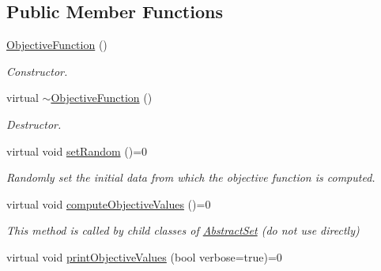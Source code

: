 \subsection*{Public Member Functions}
\begin{DoxyCompactItemize}
\item 
\hypertarget{classObjectiveFunction_a227885b9e68935571bf25d36689f029a}{\hyperlink{classObjectiveFunction_a227885b9e68935571bf25d36689f029a}{Objective\-Function} ()}\label{classObjectiveFunction_a227885b9e68935571bf25d36689f029a}

\begin{DoxyCompactList}\small\item\em Constructor. \end{DoxyCompactList}\item 
\hypertarget{classObjectiveFunction_a877b09fea55318719b9f37661ecdedf8}{virtual \hyperlink{classObjectiveFunction_a877b09fea55318719b9f37661ecdedf8}{$\sim$\-Objective\-Function} ()}\label{classObjectiveFunction_a877b09fea55318719b9f37661ecdedf8}

\begin{DoxyCompactList}\small\item\em Destructor. \end{DoxyCompactList}\item 
\hypertarget{classObjectiveFunction_a897009c58cc55bc84c29e5e3a2bfcb61}{virtual void \hyperlink{classObjectiveFunction_a897009c58cc55bc84c29e5e3a2bfcb61}{set\-Random} ()=0}\label{classObjectiveFunction_a897009c58cc55bc84c29e5e3a2bfcb61}

\begin{DoxyCompactList}\small\item\em Randomly set the initial data from which the objective function is computed. \end{DoxyCompactList}\item 
\hypertarget{classObjectiveFunction_a517095eb98863d0727a768d92fe2da0f}{virtual void \hyperlink{classObjectiveFunction_a517095eb98863d0727a768d92fe2da0f}{compute\-Objective\-Values} ()=0}\label{classObjectiveFunction_a517095eb98863d0727a768d92fe2da0f}

\begin{DoxyCompactList}\small\item\em This method is called by child classes of \hyperlink{classAbstractSet}{Abstract\-Set} (do not use directly) \end{DoxyCompactList}\item 
\hypertarget{classObjectiveFunction_a7c59c162ea11841ade84d62fd29f0694}{virtual void \hyperlink{classObjectiveFunction_a7c59c162ea11841ade84d62fd29f0694}{print\-Objective\-Values} (bool verbose=true)=0}\label{classObjectiveFunction_a7c59c162ea11841ade84d62fd29f0694}


\end{DoxyCompactItemize}
